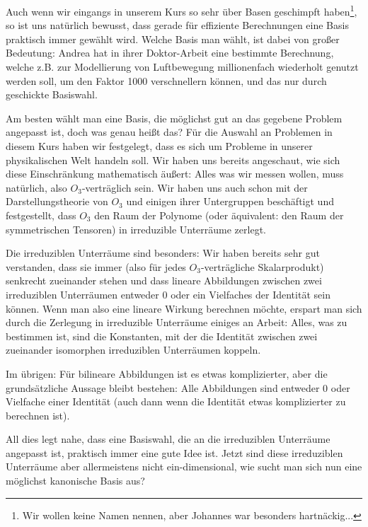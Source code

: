 Auch wenn wir eingangs in unserem Kurs so sehr über Basen geschimpft haben\footnote{Wir wollen keine Namen nennen, aber Johannes war besonders hartnäckig...}, so ist uns natürlich bewusst, dass gerade für effiziente Berechnungen eine Basis praktisch immer gewählt wird. Welche Basis man wählt, ist dabei von großer Bedeutung: Andrea hat in ihrer Doktor-Arbeit eine bestimmte Berechnung, welche z.B. zur Modellierung von Luftbewegung millionenfach wiederholt genutzt werden soll, um den Faktor 1000 verschnellern können, und das nur durch geschickte Basiswahl. 

\begin{remark}
Am besten wählt man eine Basis, die möglichst gut an das gegebene Problem angepasst ist, doch was genau heißt das? Für die Auswahl an Problemen in diesem Kurs haben wir festgelegt, dass es sich um Probleme in unserer physikalischen Welt handeln soll. Wir haben uns bereits angeschaut, wie sich diese Einschränkung mathematisch äußert: Alles was wir messen wollen, muss natürlich, also $O_3$-verträglich sein. Wir haben uns auch schon mit der Darstellungstheorie von $O_3$ und einigen ihrer Untergruppen beschäftigt und festgestellt, dass $O_3$ den Raum der Polynome (oder äquivalent: den Raum der symmetrischen Tensoren) in irreduzible Unterräume zerlegt. 
\end{remark}
\begin{remark}
Die irreduziblen Unterräume sind besonders: Wir haben bereits sehr gut verstanden, dass sie immer (also für jedes $O_3$-verträgliche Skalarprodukt) senkrecht zueinander stehen und dass lineare Abbildungen zwischen zwei irreduziblen Unterräumen entweder 0 oder ein Vielfaches der Identität sein können. Wenn man also eine lineare Wirkung berechnen möchte, erspart man sich durch die Zerlegung in irreduzible Unterräume einiges an Arbeit: Alles, was zu bestimmen ist, sind die Konstanten, mit der die Identität zwischen zwei zueinander isomorphen irreduziblen Unterräumen koppeln.
\end{remark}
\begin{remark}
Im übrigen: Für bilineare Abbildungen ist es etwas komplizierter, aber die grundsätzliche Aussage bleibt bestehen: Alle Abbildungen sind entweder 0 oder Vielfache einer Identität (auch dann wenn die Identität etwas komplizierter zu berechnen ist).
\end{remark}
\begin{remark}
 All dies legt nahe, dass eine Basiswahl, die an die irreduziblen Unterräume angepasst ist, praktisch immer eine gute Idee ist. Jetzt sind diese irreduziblen Unterräume aber allermeistens nicht ein-dimensional, wie sucht man sich nun eine möglichst kanonische Basis aus? 
\end{remark}
